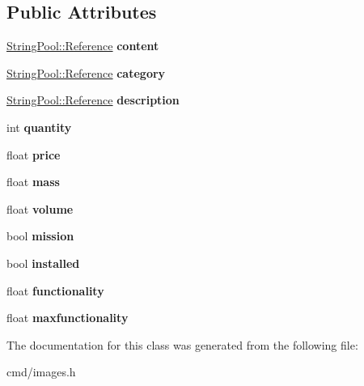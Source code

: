 \subsection*{Public Attributes}
\begin{DoxyCompactItemize}
\item 
\hyperlink{classSharedPool_1_1Reference}{String\+Pool\+::\+Reference} {\bfseries content}\hypertarget{classCargo_a690c766426e20fd3fd49572d3c8e0cb6}{}\label{classCargo_a690c766426e20fd3fd49572d3c8e0cb6}

\item 
\hyperlink{classSharedPool_1_1Reference}{String\+Pool\+::\+Reference} {\bfseries category}\hypertarget{classCargo_a6c3144d6cb0a8e98bc31028938706949}{}\label{classCargo_a6c3144d6cb0a8e98bc31028938706949}

\item 
\hyperlink{classSharedPool_1_1Reference}{String\+Pool\+::\+Reference} {\bfseries description}\hypertarget{classCargo_a0934e7d8b65e5fe4b599ed8d49813636}{}\label{classCargo_a0934e7d8b65e5fe4b599ed8d49813636}

\item 
int {\bfseries quantity}\hypertarget{classCargo_ae54f0072259df1320dfb404985d0baa7}{}\label{classCargo_ae54f0072259df1320dfb404985d0baa7}

\item 
float {\bfseries price}\hypertarget{classCargo_a5aa9629766167b0ada69e5f083f502a6}{}\label{classCargo_a5aa9629766167b0ada69e5f083f502a6}

\item 
float {\bfseries mass}\hypertarget{classCargo_a67777dab8ef455eba62086ca0c8bee82}{}\label{classCargo_a67777dab8ef455eba62086ca0c8bee82}

\item 
float {\bfseries volume}\hypertarget{classCargo_a8a78d89ab21fb1d84257b6467f7a9538}{}\label{classCargo_a8a78d89ab21fb1d84257b6467f7a9538}

\item 
bool {\bfseries mission}\hypertarget{classCargo_ae967b28b32a62fc63b1825a0ab3fd3fb}{}\label{classCargo_ae967b28b32a62fc63b1825a0ab3fd3fb}

\item 
bool {\bfseries installed}\hypertarget{classCargo_a2b80725596497037c20237bf48cce625}{}\label{classCargo_a2b80725596497037c20237bf48cce625}

\item 
float {\bfseries functionality}\hypertarget{classCargo_a246071556d2f7e56f79ac87c0e1fb7a9}{}\label{classCargo_a246071556d2f7e56f79ac87c0e1fb7a9}

\item 
float {\bfseries maxfunctionality}\hypertarget{classCargo_a2d4f11cfbc0b540fcdb9581e28298e01}{}\label{classCargo_a2d4f11cfbc0b540fcdb9581e28298e01}

\end{DoxyCompactItemize}


The documentation for this class was generated from the following file\+:\begin{DoxyCompactItemize}
\item 
cmd/images.\+h\end{DoxyCompactItemize}
